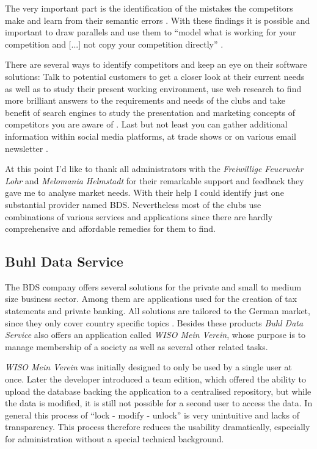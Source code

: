 The very important part is the identification of the mistakes the competitors make and learn from their semantic errors \cite{Hunter:2015aa}. With these findings it is possible and important to draw parallels and use them to \enquote{model what is working for your competition and [...] not copy your competition directly} \cite{Hunter:2015aa}. 

There are several ways to identify competitors and keep an eye on their software solutions: Talk to potential customers to get a closer look at their current needs as well as to study their present working environment, use web research to find more brilliant answers to the requirements and needs of the clubs \cite{Philips:2015aa} and take benefit of search engines to study the presentation and marketing concepts of competitors you are aware of \cite{Philips:2015aa}. Last but not least you can gather additional information within social media platforms, at trade shows or on various email newsletter \cite{Dahl:2011aa}. 

At this point I'd like to thank all administrators with the \emph{Freiwillige Feuerwehr Lohr} and \emph{Melomania Helmstadt} for their remarkable support and feedback they gave me to analyse market needs. With their help I could identify just one substantial provider named \gls{BDS}. Nevertheless most of the clubs use combinations of various services and applications since there are hardly comprehensive and affordable remedies for them to find.

\subsection{Buhl Data Service}

The \gls{BDS} company offers several solutions for the private and small to medium size business sector. Among them are applications used for the creation of tax statements and private banking. All solutions are tailored to the German market, since they only cover country specific topics \cite{Buhl:2015aa}. Besides these products \emph{Buhl Data Service} also offers an application called \emph{WISO Mein Verein}, whose purpose is to manage membership of a society as well as several other related tasks.

\emph{WISO Mein Verein} was initially designed to only be used by a single user at once. Later the developer introduced a team edition, which offered the ability to upload the database backing the application to a centralised repository, but while the data is modified, it is still not possible for a second user to access the data. In general this process of \enquote{lock - modify - unlock} is very unintuitive and lacks of transparency. This process therefore reduces the usability dramatically, especially for administration without a special technical background.

